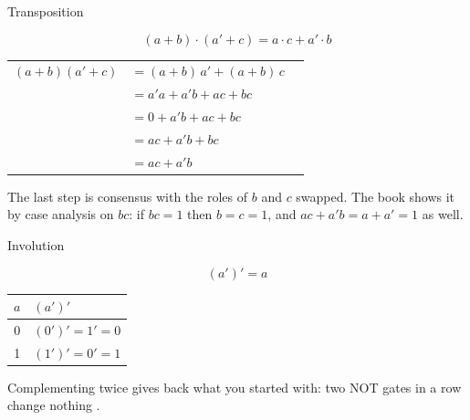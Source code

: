 \documentclass[10pt]{wosm-slides}
\makeatletter
\newenvironment{derivation}
  {\begin{tabular}{@{}r@{\;}l@{\qquad}l@{}}}
  {\end{tabular}}
\newcommand*\by[1]{\wosmlabel{#1}}
\makeatother
\begin{document}
\begin{frame}{Transposition}
  \begin{theorem}[Transposition]
    \[ (a + b) \cdot (a' + c) = a \cdot c + a' \cdot b \]
  \end{theorem}

  \small
  \begin{derivation}
    $(a + b)(a' + c)$ & $= (a + b)\,a' + (a + b)\,c$ & \by{distributivity} \\
                      & $= a'a + a'b + ac + bc$ & \by{distributivity, commutativity} \\
                      & $= 0 + a'b + ac + bc$ & \by{complement} \\
                      & $= ac + a'b + bc$ & \by{identity, commutativity} \\
                      & $= ac + a'b$ & \by{consensus} \\
  \end{derivation}

  \medskip
  \normalsize
  The last step is consensus with the roles of $b$ and $c$ swapped. The book shows
  it by case analysis on $bc$: if $bc = 1$ then $b = c = 1$, and
  $ac + a'b = a + a' = 1$ as well.
\end{frame}

\begin{frame}{Involution}
  \begin{theorem}[Involution]
    \[ (a')' = a \]
  \end{theorem}

  \begin{center}
    \begin{tabular}{@{}c|l@{}}
      $a$ & $(a')'$ \\
      \midrule
      0 & $(0')' = 1' = 0$ \\
      1 & $(1')' = 0' = 1$ \\
    \end{tabular}
  \end{center}

  \medskip
  Complementing twice gives back what you started with: two NOT gates in a row
  change nothing .
\end{frame}
\end{document}

